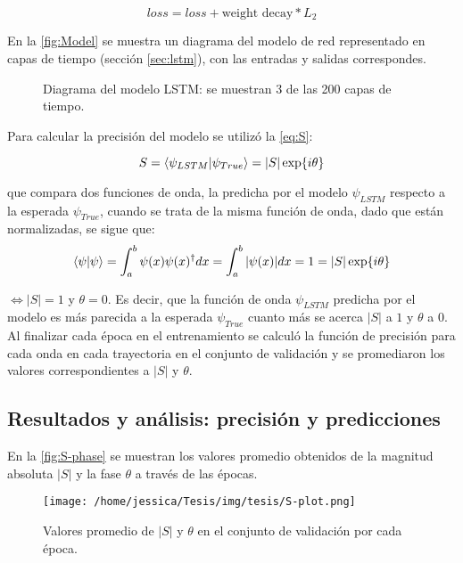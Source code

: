 \[ loss = loss + \text{weight decay}*L_2\]

En la \autoref{fig:Model} se muestra un diagrama del modelo de red representado en capas de tiempo (sección \autoref{sec:lstm}), con las entradas y salidas correspondes.

\begin{figure}[!htbp]
  \centering
  \caption{Diagrama del modelo \acs{LSTM}: se muestran 3 de las 200 capas de tiempo.}
  \label{fig:Model}
\end{figure}

Para calcular la precisión del modelo se utilizó la \autoref{eq:S}:

\begin{equation}
  \label{eq:S}
  S = \bra{\psi_{LSTM}}\ket{\psi_{True}} = |S|\exp{i\theta}
\end{equation}

que compara dos funciones de onda, la predicha por el modelo $\psi_{LSTM}$ respecto a la esperada $\psi_{True}$, cuando se trata de la misma función de onda, dado que están normalizadas, se sigue que:
\begin{equation*}
  \bra{\psi}\ket{\psi} = \int_{a}^{b}\psi(x) \psi(x)^\dag dx = \int_{a}^{b}|\psi(x)| dx = 1 = |S|\exp{i\theta}
\end{equation*}

$\iff |S|=1$ y $\theta =0$. Es decir, que la función de onda $\psi_{LSTM}$ predicha por el modelo es más parecida a la esperada $\psi_{True}$ cuanto más se acerca $|S|$ a $1$ y $\theta$ a $0$. \\

Al finalizar cada época en el entrenamiento se calculó la función de precisión para cada onda en cada trayectoria en el conjunto de validación y se promediaron los valores correspondientes a $|S|$ y $\theta$. 

\subsection{Resultados y análisis: precisión y predicciones}\label{sec:Resultados}

En la \autoref{fig:S-phase} se muestran los valores promedio obtenidos de la magnitud absoluta $|S|$ y la fase $\theta$ a través de las épocas.

\begin{figure}[!htbp]
  \centering
  \texttt{[image: /home/jessica/Tesis/img/tesis/S-plot.png]}
  \caption{Valores promedio de $|S|$ y $\theta$ en el conjunto de validación por cada época.}
  \label{fig:S-phase}
\end{figure}

